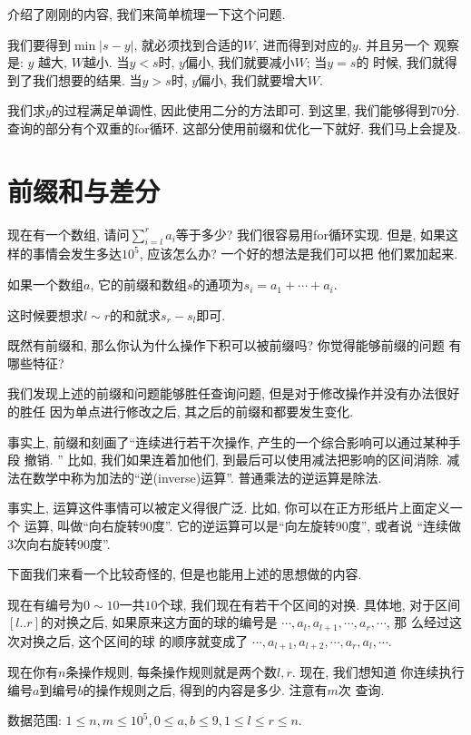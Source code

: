 介绍了刚刚的内容, 我们来简单梳理一下这个问题. 

我们要得到$\min |s-y|$, 就必须找到合适的$W$, 进而得到对应的$y$. 并且另一个
观察是: $y$ 越大, $W$越小. 当$y<s$时, $y$偏小, 我们就要减小$W$; 当$y=s$的
时候, 我们就得到了我们想要的结果. 当$y>s$时, $y$偏小, 我们就要增大$W$. 

我们求$y$的过程满足单调性, 因此使用二分的方法即可. 到这里, 我们能够得到70分. 
查询的部分有个双重的for循环. 这部分使用前缀和优化一下就好. 我们马上会提及. 

\section{前缀和与差分}

现在有一个数组, 请问$\sum_{i=l}^r a_i$等于多少? 我们很容易用for循环实现. 
但是, 如果这样的事情会发生多达$10^5$, 应该怎么办? 一个好的想法是我们可以把
他们累加起来. 

\begin{definition}
    如果一个数组$a$, 它的前缀和数组$s$的通项为$s_i = a_1 + \cdots + a_i$. 
\end{definition}

这时候要想求$l\sim r$的和就求$s_r - s_l$即可. 

\begin{ques}
    既然有前缀和, 那么你认为什么操作下积可以被前缀吗? 你觉得能够前缀的问题
    有哪些特征?  
\end{ques}

我们发现上述的前缀和问题能够胜任查询问题, 但是对于修改操作并没有办法很好的胜任
因为单点进行修改之后, 其之后的前缀和都要发生变化. 

事实上, 前缀和刻画了``连续进行若干次操作, 产生的一个综合影响可以通过某种手段
撤销. '' 比如, 我们如果连着加他们, 到最后可以使用减法把影响的区间消除. 
减法在数学中称为加法的``逆(inverse)运算''. 普通乘法的逆运算是除法. 

事实上, 运算这件事情可以被定义得很广泛. 比如, 你可以在正方形纸片上面定义一个
运算, 叫做``向右旋转90度''. 它的逆运算可以是``向左旋转90度'', 或者说
``连续做3次向右旋转90度''. 

下面我们来看一个比较奇怪的, 但是也能用上述的思想做的内容. 

\begin{example}
    现在有编号为$0\sim 10$一共$10$个球, 我们现在有若干个区间的对换. 具体地, 
    对于区间$[l..r]$的对换之后, 如果原来这方面的球的编号是
    $\cdots, a_l, a_{l+1}, \cdots, a_r, \cdots$, 那
    么经过这次对换之后, 这个区间的球
    的顺序就变成了
    $\cdots, a_{l+1}, a_{l+2}, \cdots , a_r, a_l,\cdots $. 

    现在你有$n$条操作规则, 每条操作规则就是两个数$l,r$. 现在, 我们想知道
    你连续执行编号$a$到编号$b$的操作规则之后, 得到的内容是多少. 注意有$m$次
    查询. 

    数据范围: $1\leq n, m \leq 10^5, 0\leq a, b\leq 9, 1\leq l\leq r\leq n.$
\end{example}

